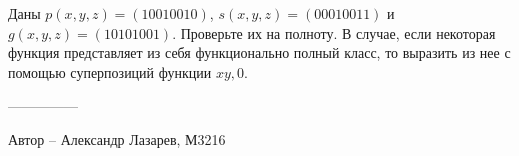 \question
Даны $p(x, y, z) = (10010010)$, $s(x, y, z) = (00010011)$ и $g(x, y, z) = (10101001)$. Проверьте их на полноту. В случае, если некоторая  функция представляет из себя функционально полный класс, то выразить из нее с помощью суперпозиций функции $xy, 0$.

---------------

Автор -- Александр Лазарев, М3216